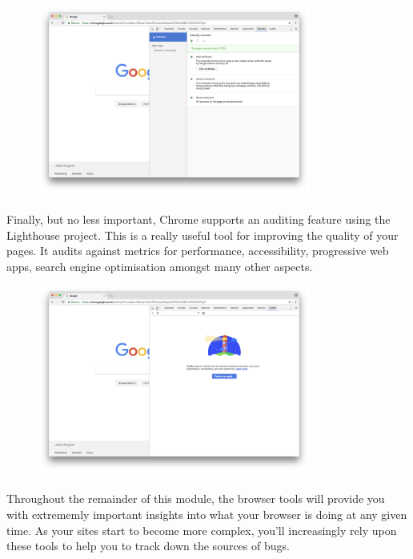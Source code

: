 \begin{figure}[H]
\centering
\includegraphics[width=0.8\textwidth]{figures/devtools-security.png}
\label{fig:devtools-security}
\end{figure}

\paragraph{} Finally, but no less important, Chrome supports an auditing feature using the Lighthouse project. This is a really useful tool for improving the quality of your pages. It audits against metrics for performance, accessibility, progressive web apps, search engine optimisation amongst many other aspects.

\begin{figure}[H]
\centering
\includegraphics[width=0.8\textwidth]{figures/devtools-audits.png}
\label{fig:devtools-audits}
\end{figure}

\paragraph{} Throughout the remainder of this module, the browser tools will provide you with extrememly important insights into what your browser is doing at any given time. As your sites start to become more complex, you'll increasingly rely upon these tools to help you to track down the sources of bugs.


